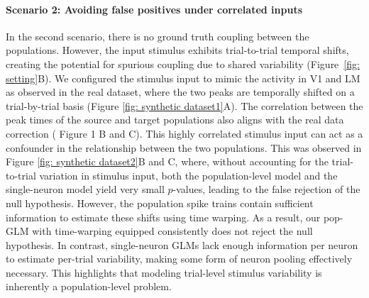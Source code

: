 \documentclass[12pt]{article}
\begin{document}
\paragraph{Scenario 2: Avoiding false positives under correlated inputs}
In the second scenario, there is no ground truth coupling between the populations. However, the input stimulus exhibits trial-to-trial temporal shifts, creating the potential for spurious coupling due to shared variability (Figure~\ref{fig: setting}B). We configured the stimulus input to mimic the activity in V1 and LM as observed in the real dataset, where the two peaks are temporally shifted on a trial-by-trial basis (Figure \ref{fig: synthetic dataset1}A). The correlation between the peak times of the source and target populations also aligns with the real data correction (\citep{chen2022population} Figure 1 B and C). This highly correlated stimulus input can act as a confounder in the relationship between the two populations. This was observed in Figure \ref{fig: synthetic dataset2}B and C, where, without accounting for the trial-to-trial variation in stimulus input, both the population-level model and the single-neuron model yield very small $p$-values, leading to the false rejection of the null hypothesis. However, the population spike trains contain sufficient information to estimate these shifts using time warping. As a result, our pop-GLM with time-warping equipped consistently does not reject the null hypothesis. In contrast, single-neuron GLMs lack enough information per neuron to estimate per-trial variability, making some form of neuron pooling effectively necessary. This highlights that modeling trial-level stimulus variability is inherently a population-level problem.
\end{document}
